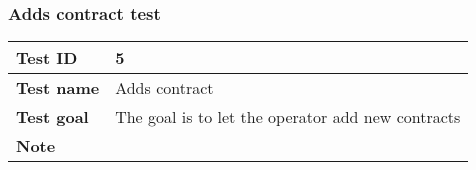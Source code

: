 {{		\subsubsection{Adds contract test}{
			\begin{center}
			\begin{tabular}{|p{4cm}|p{10cm}|}
			\hline
				\centering \vspace{1mm} \bfseries{Test ID} \vspace{1mm} & 
				\vspace{1mm} 5 \vspace{1mm}\\
			\hline
				\centering \vspace{1mm} \bfseries{Test name} \vspace{1mm} & 
				\vspace{1mm} Adds contract\vspace{1mm}\\
			\hline
				\centering \vspace{1mm} \bfseries{Test goal} \vspace{1mm} & 
				\vspace{1mm} The goal is to let the operator add new contracts\vspace{1mm}\\
			\hline
				\centering \vspace{1mm} \bfseries{Note} \vspace{1mm} & 
				\vspace{1mm}  \vspace{1mm}\\
			\hline
			\end{tabular}


\end{center}}}}
